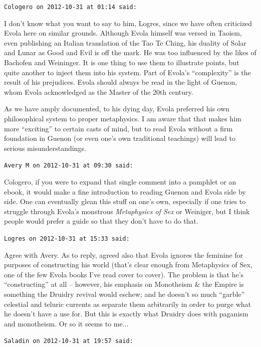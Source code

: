 \begin{footnotesize}
\begin{sffamily}
\hfill

\texttt{Cologero on 2012-10-31 at 01:14 said:}

I don't know what you want to say to him, Logres, since we have often criticized Evola here on similar grounds. Although Evola himself was versed in Taoism, even publishing an Italian translation of the Tao Te Ching, his duality of Solar and Lunar as Good and Evil is off the mark. He was too influenced by the likes of Bachofen and Weininger. It is one thing to use them to illustrate points, but quite another to inject them into his system. Part of Evola's ``complexity'' is the result of his prejudices. Evola should always be read in the light of Guenon, whom Evola acknowledged as the Master of the 20th century.

As we have amply documented, to his dying day, Evola preferred his own philosophical system to proper metaphysics. I am aware that that makes him more ``exciting'' to certain casts of mind, but to read Evola without a firm foundation in Guenon (or even one's own traditional teachings) will lead to serious misunderstandings.

\hfill

\texttt{Avery M on 2012-10-31 at 09:30 said:}

Cologero, if you were to expand that single comment into a pamphlet or an ebook, it would make a fine introduction to reading Guenon and Evola side by side. One can eventually glean this stuff on one's own, especially if one tries to struggle through Evola's monstrous \emph{Metaphysics of Sex} or Weiniger, but I think people would prefer a guide so that they don't have to do that.

\hfill

\texttt{Logres on 2012-10-31 at 15:33 said:}

Agree with Avery. As to reply, agreed also that Evola ignores the feminine for purposes of constructing his world (that's clear enough from Metaphysics of Sex, one of the few Evola books I've read cover to cover). The problem is that he's ``constructing'' at all -- however, his emphasis on Monotheism \& the Empire is something the Druidry revival would eschew; and he doesn't so much ``garble'' celestial and teluric currents as separate them arbitrarily in order to purge what he doesn't have a use for. But this is exactly what Druidry does with paganism and monotheism. Or so it seems to me... 

\hfill

\texttt{Saladin on 2012-10-31 at 19:57 said:}


\end{sffamily}
\end{footnotesize}
